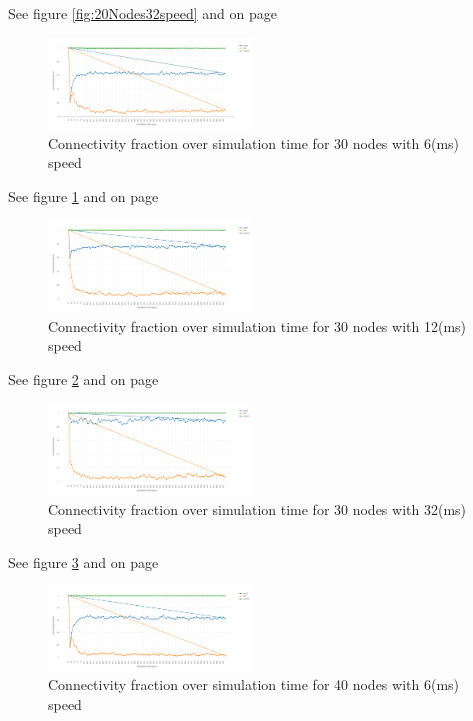 \documentclass[letterpaper, 10 pt, conference]{ieeeconf}  %
\begin{document}
See figure \ref{fig:20Nodes32speed} and on page \pageref{fig:20Nodes32speed}



\begin{figure}[H]
\includegraphics[width=0.48\textwidth]{30Nodes06speed}
\caption{Connectivity fraction over simulation time for 30 nodes with 6(ms) speed}
\label{fig:30Nodes06speed}
\end{figure}

See figure \ref{fig:30Nodes06speed} and on page \pageref{fig:30Nodes06speed}



\begin{figure}[H]
\includegraphics[width=0.48\textwidth]{30Nodes12speed}
\caption{Connectivity fraction over simulation time for 30 nodes with 12(ms) speed}
\label{fig:30Nodes12speed}
\end{figure}

See figure \ref{fig:30Nodes12speed} and on page \pageref{fig:30Nodes12speed}



\begin{figure}[H]
\includegraphics[width=0.48\textwidth]{30Nodes32speed}
\caption{Connectivity fraction over simulation time for 30 nodes with 32(ms) speed}
\label{fig:30Nodes32speed}
\end{figure}

See figure \ref{fig:30Nodes32speed} and on page \pageref{fig:30Nodes32speed}


\begin{figure}[H]
\includegraphics[width=0.48\textwidth]{40Nodes06speed}
\caption{Connectivity fraction over simulation time for 40 nodes with 6(ms) speed}
\label{fig:40Nodes06speed}
\end{figure}
\end{document}
